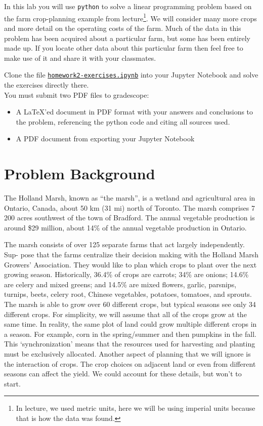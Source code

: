 \documentclass[letter]{article}
\newcommand{\setheader}[6]{
	\lhead{{\sc #1}\\{\sc #2}}%
	\rhead{
		{\bf #3} 
		\ifthenelse{\equal{#4}{}}{}{(#4)}\\
		{\bf #5} 
		\ifthenelse{\equal{#6}{}}{}{(#6)}%
	}
}
\begin{document}
	\setheader{APM348}{Homework 2}{Due: 5:59pm February 8}{}{}{}


In this lab you will use \texttt{python} to solve a linear programming problem based on the farm crop-planning example from lecture\footnote{In lecture, we used metric units, here we will be using imperial units because that is how the data was found.}. We will consider many more crops and more detail on the operating costs of the farm. Much of the data in this problem has been acquired about a particular farm, but some has been entirely made up. If you locate other data about this particular farm then feel free to make use of it and share it with your classmates.


Clone the file \href{https://utoronto.syzygy.ca/jupyter/user-redirect/git-pull?repo=https://github.com/bigfatbernie/IBLMathModeling&subPath=homeworks/homework2/homework2-exercises.ipynb}{\tt homework2-exercises.ipynb} into your Jupyter Notebook and solve the exercises directly there. \\

You must submit two PDF files to gradescope:
\begin{itemize}
	\item A \LaTeX'ed document in PDF format with your answers and conclusions to the problem, referencing the python code and citing all sources used.
	\item A PDF document from exporting your Jupyter Notebook
\end{itemize}



\section{Problem Background}

The Holland Marsh, known as ``the marsh'', is a wetland and agricultural area in Ontario, Canada, about 50 km (31 mi) north of Toronto. The marsh comprises 7\,200 acres southwest of the town of Bradford. The annual vegetable production is around \$29 million, about 14\% of the annual vegetable production in Ontario.

The marsh consists of over 125 separate farms that act largely independently. Sup- pose that the farms centralize their decision making with the Holland Marsh Growers' Association. They would like to plan which crops to plant over the next growing season.
Historically, 36.4\% of crops are carrots; 34\% are onions; 14.6\% are celery and mixed greens; and 14.5\% are mixed flowers, garlic, parsnips, turnips, beets, celery root, Chinese vegetables, potatoes, tomatoes, and sprouts. The marsh is able to grow over 60 different crops, but typical seasons see only 34 different crops.
For simplicity, we will assume that all of the crops grow at the same time. In reality, the same plot of land could grow multiple different crops in a season. For example, corn in the spring/summer and then pumpkins in the fall. This `synchronization' means that the resources used for harvesting and planting must be exclusively allocated. Another aspect of planning that we will ignore is the interaction of crops. The crop choices on adjacent land or even from different seasons can affect the yield. We could account for these details, but won't to start.
\end{document}
